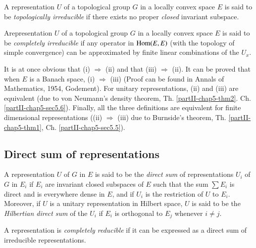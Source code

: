 \begin{defn}\label{partII-chap5-defi2} 
A representation  $U$ of a
   topological  group  $G$ in  a locally  convex  space $E$  is  said
   to be  {\em topologically  irreducible}  if there  exists  no
   proper {\em closed}  invariant  subspace. 
\end{defn}
 
 \begin{defn}\label{partII-chap5-defi3}%
  A\pageoriginale representation  $U$ of  a topological
   group  $G$ in a locally convex space  $E$ is said to  be {\em
     completely irreducible}  if  any operator  in $\operatorname{Hom} (E,E)$ (with
   the topology  of simple convergence)  can be approximated by
   finite linear combinations  of the $U_{x}$. 
\end{defn}

It is at once obvious  that (i) $\Rightarrow$ (ii)  and that
(iii) $\Rightarrow$ (ii).  
It can be proved that when $E$ is a Banach space, (i) $\Rightarrow$
(iii) (Proof can be found in Annals  of
Mathematics, 1954, Godement). For unitary representations, (ii) and
(iii) are equivalent (due to von Neumann's density  theorem,
Th. \ref{partII-chap5-thm2}. Ch. \ref{partII-chap5-sec5.6}). Finally,
all the three   
  definitions   are  equivalent  for  finite dimensional
  representations ((ii) $\Rightarrow$  (iii) due to  Burnside's
  theorem, Th. \ref{partII-chap5-thm1}, Ch. \ref{partII-chap5-sec5.5}). 

\subsection{Direct  sum of  representations}\label{partII-chap5-sec5.3}%

\begin{defi*}%
 A representation $U$ of $G$ in $E$ is said to be the {\em direct sum}
 of representations $U_{i}$ of $G$  in $E_{i}$ if $E_i$ are invariant
 closed subspaces of $E$ such that the sum $\sum E_{i} $  is direct
 and is  everywhere  dense in $E$, and if $U_{i} $ is the restriction
 of $U$ to $E_{i}$. Moreover, if $U$ is a unitary  representation in
 Hilbert space, $U$ is said to be the  {\em Hilbertian direct sum} of
 the $U_{i}$ if  $E_{i}$ is  orthogonal  to  $E_{j}$  whenever $i \neq
 j$.  
\end{defi*}
 
\begin{defi*} %
A  representation is {\em completely reducible}  if it can be expressed
as a direct  sum of irreducible  representations. 
\end{defi*}
 
